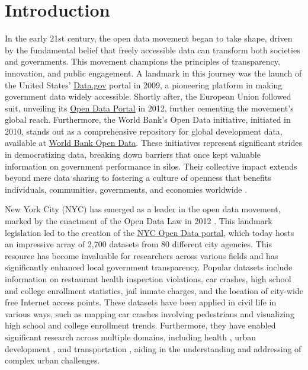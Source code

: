 \documentclass[linenumber]{jdsart}
\begin{document}
\section{Introduction} 
\label{sec:intro}

In the early 21st century, the open data movement began 
to take shape, driven by the fundamental belief that 
freely accessible data can transform both societies and 
governments. This movement champions the principles
of transparency, innovation, and public engagement. 
A landmark in this journey was the launch of the United States'
\href{https://www.data.gov}{Data.gov} portal in 2009, a pioneering
platform in making government data widely accessible. Shortly after,
the European Union followed suit, unveiling its
\href{https://data.europa.eu/euodp}{Open Data Portal} in 2012, further
cementing the movement's global reach. Furthermore, the World Bank's Open
Data initiative, initiated in 2010, stands out as a comprehensive
repository for global development data, available at
\href{https://data.worldbank.org}{World Bank Open Data}. 
These initiatives represent significant strides in democratizing data, 
breaking down barriers that once kept valuable information 
on government performance in silos. Their collective impact 
extends beyond mere data sharing to fostering a culture of openness 
that benefits individuals, communities, governments, and economies worldwide 
\citep{barns2016mine, wang2016adoption}.


New York City (NYC) has emerged as a leader in the open data movement,
marked by the enactment of the Open Data Law in 2012
\citep{zuiderwijk2014open}. This landmark legislation led to the
creation of the \href{https://opendata.cityofnewyork.us}{NYC Open Data
  portal}, which today hosts an impressive array of 2,700 datasets
from 80 different city agencies. This resource has become invaluable
for researchers across various fields and has significantly enhanced
local government transparency. Popular datasets include information on
restaurant health inspection violations, car crashes, high school and
college enrollment statistics, jail inmate charges, and the location
of city-wide free Internet access points. These datasets have been
applied in civil life in various ways, such as mapping car crashes
involving pedestrians and visualizing high school and college
enrollment trends. Furthermore, they have enabled significant research
across multiple domains, including health \citep{cantor2018facets,
  shankar2021data}, urban development \citep{neves2020impacts}, and
transportation \citep{gerte2019understanding}, aiding in the
understanding and addressing of complex urban challenges.
\end{document}
